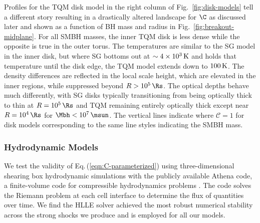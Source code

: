 

Profiles for the TQM disk model in the right column of Fig.~\ref{fig:disk-models} tell a different story resulting in a drastically altered landscape for $\C$ as discussed later and shown as a function of BH mass and radius in Fig.~\ref{fig:breakout-midplane}.
For all SMBH masses, the inner TQM disk is less dense while the opposite is true in the outer torus.
The temperatures are similar to the SG model in the inner disk, but where SG bottoms out at $\sim 4 \times 10^3\,\rm{K}$ and holds that temperature until the disk edge, the TQM model extends down to $100\,\rm{K}$.
The density differences are reflected in the local scale height, which are elevated in the inner regions, while suppressed beyond $R>10^5\,\Rs$.
The optical depths behave much differently, with SG disks typically transitioning from being optically thick to thin at $R=10^5\,\Rs$ and TQM remaining entirely optically thick except near $R=10^4\,\Rs$ for $\Mbh<10^7\,\msun$.
The vertical lines indicate where $\mathcal{C}=1$ for disk models corresponding to the same line styles indicating the SMBH mass.


\subsubsection{Hydrodynamic Models}
\label{sec:hydro}

We test the validity of Eq.\,(\ref{eqn:C-parameterized}) using three-dimensional shearing box hydrodynamic simulations with the publicly available Athena code, a finite-volume code for compressible hydrodynamics problems \citep{Stone+08, StoneGardiner10}.
The code solves the Riemann problem at each cell interface to determine the flux of quantities over time.
We find the HLLE solver \citep{Einfeldt+91} achieved the most robust numerical stability across the strong shocks we produce and is employed for all our models.

